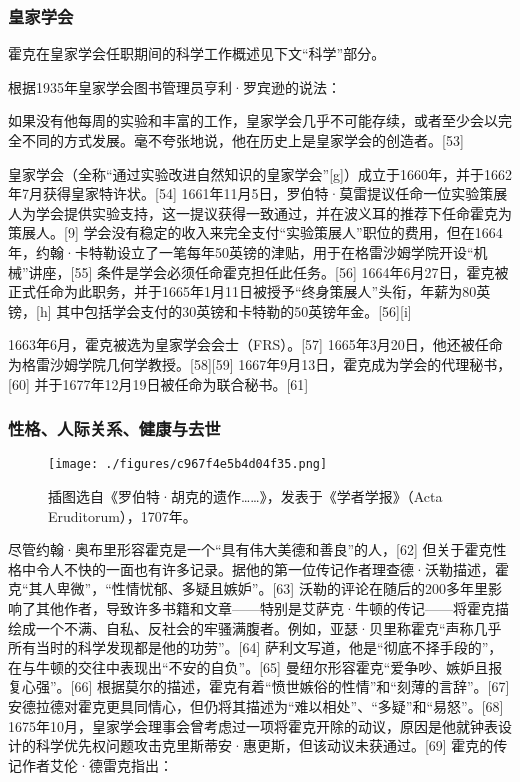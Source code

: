 \subsubsection{皇家学会}
霍克在皇家学会任职期间的科学工作概述见下文“科学”部分。

根据1935年皇家学会图书管理员亨利·罗宾逊的说法：

如果没有他每周的实验和丰富的工作，皇家学会几乎不可能存续，或者至少会以完全不同的方式发展。毫不夸张地说，他在历史上是皇家学会的创造者。[53]

皇家学会（全称“通过实验改进自然知识的皇家学会”[g]）成立于1660年，并于1662年7月获得皇家特许状。[54] 1661年11月5日，罗伯特·莫雷提议任命一位实验策展人为学会提供实验支持，这一提议获得一致通过，并在波义耳的推荐下任命霍克为策展人。[9] 学会没有稳定的收入来完全支付“实验策展人”职位的费用，但在1664年，约翰·卡特勒设立了一笔每年50英镑的津贴，用于在格雷沙姆学院开设“机械”讲座，[55] 条件是学会必须任命霍克担任此任务。[56] 1664年6月27日，霍克被正式任命为此职务，并于1665年1月11日被授予“终身策展人”头衔，年薪为80英镑，[h] 其中包括学会支付的30英镑和卡特勒的50英镑年金。[56][i]

1663年6月，霍克被选为皇家学会会士（FRS）。[57] 1665年3月20日，他还被任命为格雷沙姆学院几何学教授。[58][59] 1667年9月13日，霍克成为学会的代理秘书，[60] 并于1677年12月19日被任命为联合秘书。[61]
\subsubsection{性格、人际关系、健康与去世}
\begin{figure}[ht]
\centering
\texttt{[image: ./figures/c967f4e5b4d04f35.png]}
\caption{插图选自《罗伯特·胡克的遗作……》，发表于《学者学报》（Acta Eruditorum），1707年。} \label{fig_HK_3}
\end{figure}
尽管约翰·奥布里形容霍克是一个“具有伟大美德和善良”的人，[62] 但关于霍克性格中令人不快的一面也有许多记录。据他的第一位传记作者理查德·沃勒描述，霍克“其人卑微”，“性情忧郁、多疑且嫉妒”。[63] 沃勒的评论在随后的200多年里影响了其他作者，导致许多书籍和文章——特别是艾萨克·牛顿的传记——将霍克描绘成一个不满、自私、反社会的牢骚满腹者。例如，亚瑟·贝里称霍克“声称几乎所有当时的科学发现都是他的功劳”。[64] 萨利文写道，他是“彻底不择手段的”，在与牛顿的交往中表现出“不安的自负”。[65] 曼纽尔形容霍克“爱争吵、嫉妒且报复心强”。[66] 根据莫尔的描述，霍克有着“愤世嫉俗的性情”和“刻薄的言辞”。[67] 安德拉德对霍克更具同情心，但仍将其描述为“难以相处”、“多疑”和“易怒”。[68] 1675年10月，皇家学会理事会曾考虑过一项将霍克开除的动议，原因是他就钟表设计的科学优先权问题攻击克里斯蒂安·惠更斯，但该动议未获通过。[69] 霍克的传记作者艾伦·德雷克指出：

